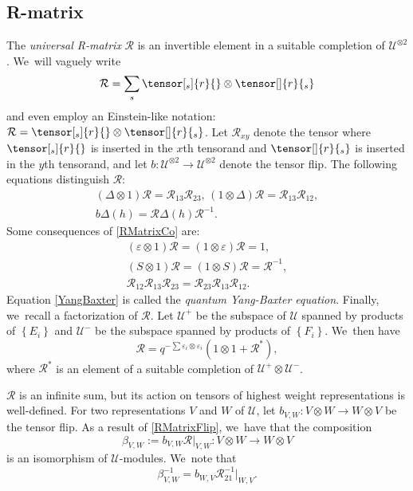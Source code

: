 \documentclass[JEP,XML,SOM,Unicode,published]{cedram}
\let\epsilon\varepsilon
\theoremstyle{definition}
\newcommand{\UU}{\mathcal{U}}
\begin{document}
\subsection{R-matrix}\label{RMatrix}
The \textit{universal R-matrix} $\mathcal{R}$ is an invertible element in a suitable completion of $\mathcal{U}^{\otimes 2}$. We~will vaguely write
\[
\mathcal{R}=\sum_s\tensor[_s]{r}{}\otimes \tensor[]{r}{_s}
\]
and even employ an Einstein-like notation: $\mathcal{R}=\tensor[_s]{r}{}\otimes \tensor[]{r}{_s}$.
Let $\mathcal{R}_{xy}$ denote the tensor where $\tensor[_s]{r}{}$ is inserted in the $x$th tensorand and $\tensor[]{r}{_s}$ is inserted in the $y$th tensorand, and let $b:\mathcal{U}^{\otimes 2}\to\mathcal{U}^{\otimes 2}$ denote the tensor flip.
The following equations distinguish $\mathcal{R}$:
\begin{gather}
(\Delta\otimes 1)\mathcal{R}=\mathcal{R}_{13}\mathcal{R}_{23},\,(1\otimes\Delta)\mathcal{R}=\mathcal{R}_{13}\mathcal{R}_{12},\label{RMatrixCo}\\
b\Delta(h)=\mathcal{R}\Delta(h)\mathcal{R}^{-1}.\label{RMatrixFlip}
\end{gather}
Some consequences of \eqref{RMatrixCo} are:
\begin{gather}
(\epsilon\otimes 1)\mathcal{R}=(1\otimes\epsilon)\mathcal{R}=1\label{RMatrixCounit},\\
(S\otimes 1)\mathcal{R}=(1\otimes S)\mathcal{R}=\mathcal{R}^{-1}\label{RMatrixInverse},\\
\mathcal{R}_{12}\mathcal{R}_{13}\mathcal{R}_{23}=\mathcal{R}_{23}\mathcal{R}_{13}\mathcal{R}_{12}.\label{YangBaxter}
\end{gather}
Equation \eqref{YangBaxter} is called the \textit{quantum Yang-Baxter equation}.
Finally, we~recall a factorization of $\mathcal{R}$.
Let $\UU^+$ be the subspace of $\UU$ spanned by products of $\left\{ E_i \right\}$ and $\UU^-$ be the subspace spanned by products of $\left\{ F_i \right\}$. We~then have
\begin{equation}
\mathcal{R}=q^{-\sum \epsilon_i\otimes \epsilon_i}(1\otimes 1+\mathcal{R}^*),
\label{RFactor}
\end{equation}
where $\mathcal{R}^*$ is an element of a suitable completion of $\UU^+\otimes\UU^-$.

$\mathcal{R}$ is an infinite sum, but its action on tensors of highest weight representations is well-defined.
For two representations $V$ and $W$ of $\mathcal{U}$, let $b_{V,W}:V\otimes W\to W\otimes V$ be the tensor flip.
As a result of \eqref{RMatrixFlip}, we~have that the composition
\[
\beta_{V,W}:=b_{V,W}\mathcal{R}\big|_{V,W}:V\otimes W\to W\otimes V
\]
is an isomorphism of $\mathcal{U}$-modules. We~note that
\[
\beta_{V,W}^{-1} = b_{W, V}\mathcal{R}^{-1}_{21}\big|_{W,V}.
\]
\end{document}
